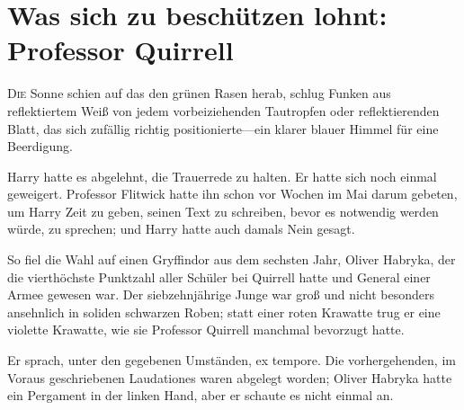\chapter{Was sich zu beschützen lohnt: Professor Quirrell}

\lettrine{D}{ie} Sonne schien auf das den grünen Rasen herab, schlug Funken aus reflektiertem Weiß von jedem vorbeiziehenden Tautropfen oder reflektierenden Blatt, das sich zufällig richtig positionierte—ein klarer blauer Himmel für eine Beerdigung.

Harry hatte es abgelehnt, die Trauerrede zu halten. Er hatte sich noch einmal geweigert. Professor Flitwick hatte ihn schon vor Wochen im Mai darum gebeten, um Harry Zeit zu geben, seinen Text zu schreiben, bevor es notwendig werden würde, zu sprechen; und Harry hatte auch damals Nein gesagt.

So fiel die Wahl auf einen Gryffindor aus dem sechsten Jahr, Oliver Habryka, der die vierthöchste Punktzahl aller Schüler bei Quirrell hatte und General einer Armee gewesen war. Der siebzehnjährige Junge war groß und nicht besonders ansehnlich in soliden schwarzen Roben; statt einer roten Krawatte trug er eine violette Krawatte, wie sie Professor Quirrell manchmal bevorzugt hatte.

Er sprach, unter den gegebenen Umständen, ex tempore. Die vorhergehenden, im Voraus geschriebenen Laudationes waren abgelegt worden; Oliver Habryka hatte ein Pergament in der linken Hand, aber er schaute es nicht einmal an.

